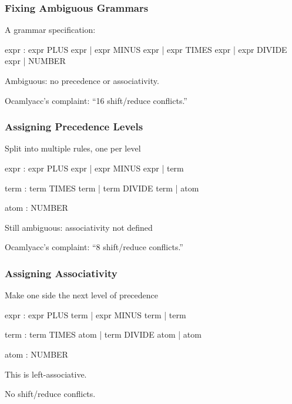 \documentclass{plt}
\begin{document}
\begin{frame}[fragile=singleslide]
  \frametitle{Fixing Ambiguous Grammars}

A grammar specification:

\begin{ocamlyacc}
expr :
    expr PLUS expr  
  | expr MINUS expr 
  | expr TIMES expr 
  | expr DIVIDE expr
  | NUMBER          
\end{ocamlyacc}

Ambiguous: no precedence or associativity.

Ocamlyacc's complaint: ``16 shift/reduce conflicts.''

\end{frame}

\begin{frame}[fragile=singleslide]
  \frametitle{Assigning Precedence Levels}

Split into multiple rules, one per level

\begin{ocamlyacc}
expr : expr PLUS expr  
     | expr MINUS expr 
     | term            

term : term TIMES term 
     | term DIVIDE term
     | atom            

atom  : NUMBER         
\end{ocamlyacc}

Still ambiguous: associativity not defined

Ocamlyacc's complaint: ``8 shift/reduce conflicts.''

\end{frame}

\begin{frame}[fragile=singleslide]
  \frametitle{Assigning Associativity}

Make one side the next level of precedence

\begin{ocamlyacc}
expr : expr PLUS term  
     | expr MINUS term 
     | term            

term : term TIMES atom 
     | term DIVIDE atom
     | atom            

atom  : NUMBER         
\end{ocamlyacc}

This is left-associative.

No shift/reduce conflicts.

\end{frame}

\renewcommand{\id}{\textbf{Id}}
\end{document}

